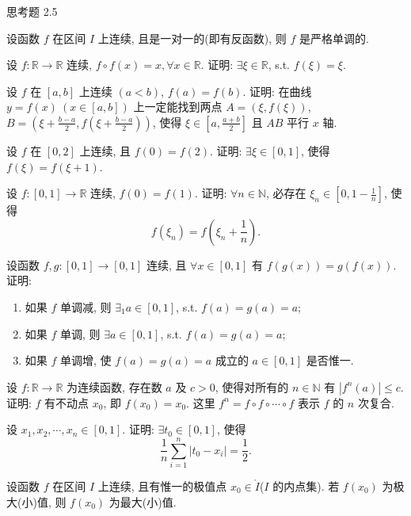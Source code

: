 \begin{exblock}{思考题 2.5}
\item 设函数 $f$ 在区间 $I$ 上连续, 且是一对一的(即有反函数), 则 $f$ 是严格单调的.

\item 设 $f\colon \mathbb{R} \to \mathbb{R}$ 连续, $f \circ f(x) = x, \forall x \in \mathbb{R}$. 证明: $\exists \xi \in \mathbb{R}$, s.t. $f(\xi) = \xi$.

\item 设 $f$ 在 $[a,b]$ 上连续 $(a < b)$, $f(a) = f(b)$. 证明: 在曲线 $y = f(x)\ (x \in [a,b])$ 上一定能找到两点 $A = (\xi, f(\xi))$, $B = \left(\xi + \frac{b-a}{2}, f\left(\xi + \frac{b-a}{2}\right)\right)$, 使得 $\xi \in \left[a, \frac{a+b}{2}\right]$ 且 $AB$ 平行 $x$ 轴.

\item 设 $f$ 在 $[0,2]$ 上连续, 且 $f(0) = f(2)$. 证明: $\exists \xi \in [0,1]$, 使得 $f(\xi) = f(\xi + 1)$.

\item 设 $f\colon [0,1] \to \mathbb{R}$ 连续, $f(0) = f(1)$. 证明: $\forall n \in \mathbb{N}$, 必存在 $\xi_n \in \left[0, 1 - \frac{1}{n}\right]$, 使得
  \[
  f(\xi_n) = f\left(\xi_n + \frac{1}{n}\right).
\]

\item 设函数 $f, g\colon [0,1] \to [0,1]$ 连续, 且 $\forall x \in [0,1]$ 有 $f(g(x)) = g(f(x))$. 证明:
  \begin{enumerate}[label=(\arabic*)]
    \item 如果 $f$ 单调减, 则 $\exists_1 a \in [0,1]$, s.t. $f(a) = g(a) = a$;
    \item 如果 $f$ 单调, 则 $\exists a \in [0,1]$, s.t. $f(a) = g(a) = a$;
    \item 如果 $f$ 单调增, 使 $f(a) = g(a) = a$ 成立的 $a \in [0,1]$ 是否惟一.
  \end{enumerate}

\item 设 $f\colon \mathbb{R} \to \mathbb{R}$ 为连续函数, 存在数 $a$ 及 $c > 0$, 使得对所有的 $n \in \mathbb{N}$ 有 $|f^n(a)| \leqslant c$. 证明: $f$ 有不动点 $x_0$, 即 $f(x_0) = x_0$. 这里 $f^n = f \circ f \circ \cdots \circ f$ 表示 $f$ 的 $n$ 次复合.

\item 设 $x_1, x_2, \cdots, x_n \in [0,1]$. 证明: $\exists t_0 \in [0,1]$, 使得
  \[
  \frac{1}{n}\sum_{i=1}^{n} |t_0 - x_i| = \frac{1}{2}.
\]

\item 设函数 $f$ 在区间 $I$ 上连续, 且有惟一的极值点 $x_0 \in \mathring{I}$($I$ 的内点集). 若 $f(x_0)$ 为极大(小)值, 则 $f(x_0)$ 为最大(小)值.


\end{exblock}
